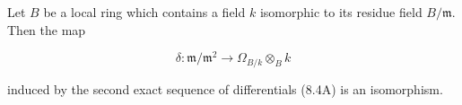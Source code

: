 Let $B$ be a local ring which contains a field $k$ isomorphic to its residue field $B/\mathfrak{m}$. Then the map

$$\delta: \mathfrak{m}/\mathfrak{m}^2 \to \Omega_{B/k} \otimes_B k$$

induced by the second exact sequence of differentials (8.4A) is an isomorphism.
